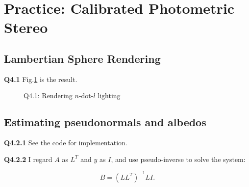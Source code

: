 \documentclass[
  course = {{16-720B Computer Vision}},
  quartile = {{1}},
  assignment = 5\ -\ 3D\ Reconstruction\ \&\ Photometric\ Stereo,
  name = {{Kangle Deng}},
  email = {{kangled@andrew.cmu.edu}},
  firstexercise = 1
]{aga-homework}
\begin{document}
\section{Practice: Calibrated Photometric Stereo}
\subsection{Lambertian Sphere Rendering}

\noindent\textbf{Q4.1} Fig.\ref{fig:cv_hw5_q41} is the result.

\begin{figure}
    \centering
    \caption{Q4.1: Rendering $n$-dot-$l$ lighting}
    \label{fig:cv_hw5_q41}
\end{figure}

\subsection{Estimating pseudonormals and albedos}
\noindent\textbf{Q4.2.1} See the code for implementation.

\noindent\textbf{Q4.2.2} I regard $A$ as $L^T$ and $y$ as $I$, and use pseudo-inverse to solve the system:

\begin{equation*}
    B = (LL^T)^{-1}LI.
\end{equation*}
\end{document}
